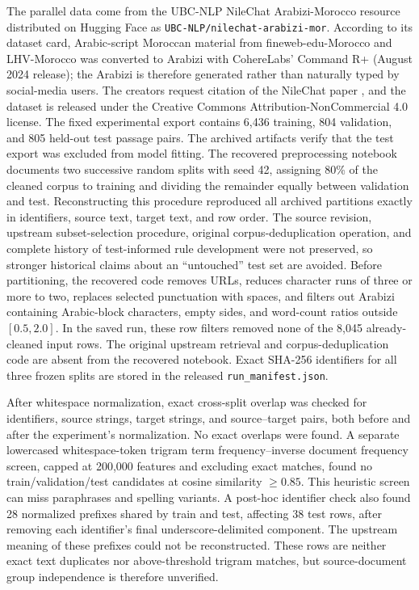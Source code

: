 \documentclass[runningheads]{llncs}
\begin{document}
The parallel data come from the UBC-NLP NileChat Arabizi-Morocco resource distributed on Hugging Face as \texttt{UBC-NLP/nilechat-arabizi-mor}. According to its dataset card, Arabic-script Moroccan material from fineweb-edu-Morocco and LHV-Morocco was converted to Arabizi with CohereLabs' Command R+ (August 2024 release); the Arabizi is therefore generated rather than naturally typed by social-media users. The creators request citation of the NileChat paper \citep{el-mekki-etal-2025-nilechat}, and the dataset is released under the Creative Commons Attribution-NonCommercial 4.0 license. The fixed experimental export contains 6,436 training, 804 validation, and 805 held-out test passage pairs. The archived artifacts verify that the test export was excluded from model fitting. The recovered preprocessing notebook documents two successive random splits with seed 42, assigning 80\% of the cleaned corpus to training and dividing the remainder equally between validation and test. Reconstructing this procedure reproduced all archived partitions exactly in identifiers, source text, target text, and row order. The source revision, upstream subset-selection procedure, original corpus-deduplication operation, and complete history of test-informed rule development were not preserved, so stronger historical claims about an ``untouched'' test set are avoided. Before partitioning, the recovered code removes URLs, reduces character runs of three or more to two, replaces selected punctuation with spaces, and filters out Arabizi containing Arabic-block characters, empty sides, and word-count ratios outside $[0.5,2.0]$. In the saved run, these row filters removed none of the 8,045 already-cleaned input rows. The original upstream retrieval and corpus-deduplication code are absent from the recovered notebook. Exact SHA-256 identifiers for all three frozen splits are stored in the released \texttt{run\_manifest.json}.

After whitespace normalization, exact cross-split overlap was checked for identifiers, source strings, target strings, and source--target pairs, both before and after the experiment's normalization. No exact overlaps were found. A separate lowercased whitespace-token trigram term frequency--inverse document frequency screen, capped at 200,000 features and excluding exact matches, found no train/validation/test candidates at cosine similarity $\geq 0.85$. This heuristic screen can miss paraphrases and spelling variants. A post-hoc identifier check also found 28 normalized prefixes shared by train and test, affecting 38 test rows, after removing each identifier's final underscore-delimited component. The upstream meaning of these prefixes could not be reconstructed. These rows are neither exact text duplicates nor above-threshold trigram matches, but source-document group independence is therefore unverified.
\end{document}
